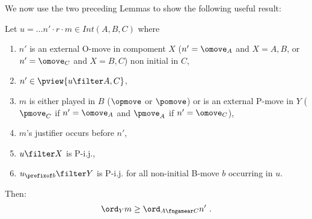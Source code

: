 We now use the two preceding Lemmas to show
the following useful result:
\begin{lemma}
\label{lem:increasing_order}
Let $u = \ldots n' \cdot r \cdot m \in Int(A,B,C)$ where
\begin{enumerate}
\item
$n'$ is an external O-move in compoment $X$
($n'=\omove_A$ and $X=A,B$, or $n'=\omove_C$ and $X=B,C$)  non initial in $C$,
\item $n' \in \pview{u\filter A,C}$,
\item $m$ is either played in $B$
($\opmove$ or $\pomove$) or is an external
 P-move in $Y$
($\pmove_C$ if $n'=\omove_A$ and
$\pmove_A$ if $n'=\omove_C$),
\item $m$'s justifier occurs before $n'$,
\item $u\filter X$ is P-i.j.,
\item $u_{\prefixof b}\filter Y$ is P-i.j. for all non-initial B-move $b$ occurring in $u$.
\end{enumerate}
Then:
$$ \ord_{Y} m \geq \ord_{A\fngamear C} n' \ .$$
\end{lemma}
